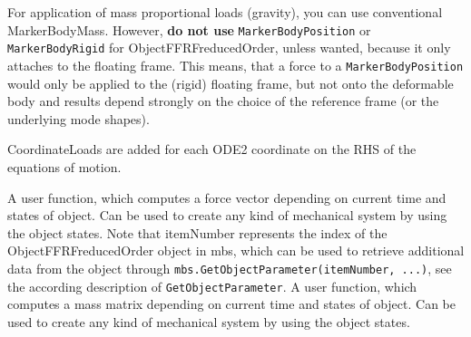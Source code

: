     For application of mass proportional loads (gravity), you can use conventional MarkerBodyMass.
    However, {\bf do not use} \texttt{MarkerBodyPosition} or \texttt{MarkerBodyRigid} for ObjectFFRFreducedOrder, unless wanted, because it only attaches to the floating
    frame. This means, that a force to a \texttt{MarkerBodyPosition} would only be applied to the (rigid) floating frame, but not onto the deformable body and
    results depend strongly on the choice of the reference frame (or the underlying mode shapes).
    
    CoordinateLoads are added for each ODE2 coordinate on the RHS of the equations of motion. 
    
    
    A user function, which computes a force vector depending on current time and states of object. Can be used to create any kind of mechanical system by using the object states.
    Note that itemNumber represents the index of the ObjectFFRFreducedOrder object in mbs, which can be used to retrieve additional data from the object through
    \texttt{mbs.GetObjectParameter(itemNumber, ...)}, see the according description of \texttt{GetObjectParameter}.
    \finishTable
    A user function, which computes a mass matrix depending on current time and states of object. Can be used to create any kind of mechanical system by using the object states.
